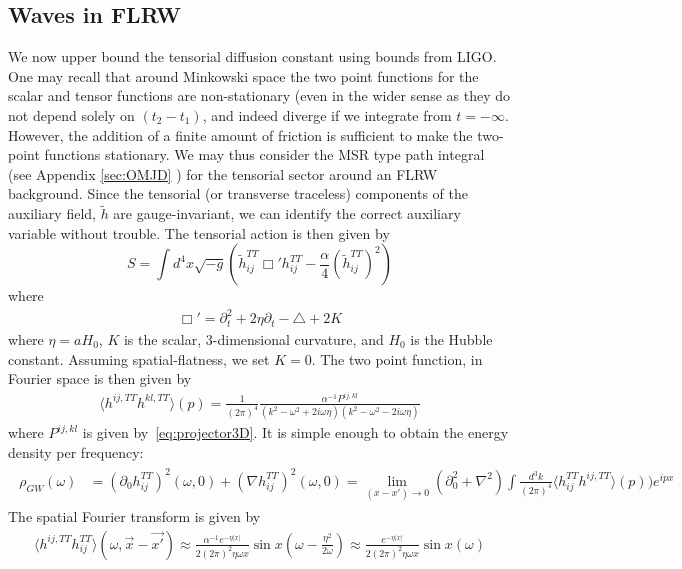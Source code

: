 \documentclass[aps,preprintnumbers,superscriptaddress,longbibliography]{revtex4-1}
\begin{document}
\subsection{Waves in FLRW}
\label{Tensor}
We now upper bound the tensorial diffusion constant using bounds from LIGO. One may recall that around Minkowski space the two point functions for the scalar and tensor functions are non-stationary (even in the wider sense as they do not depend solely on $(t_2-t_1)$, and indeed diverge if we integrate from $t=-\infty$. However, the addition of a finite amount of friction is sufficient to make the two-point functions stationary. We may thus consider the MSR type path integral (see Appendix \ref{sec:OMJD} ) for the tensorial sector around an FLRW background. Since the tensorial (or transverse traceless) components of the auxiliary field, $\tilde{h}$ are gauge-invariant, we can identify  the correct auxiliary variable without trouble.
The tensorial action is then given by
\begin{equation}
    S=\int d^4x\sqrt{-g}(\tilde{h}_{ij}^{TT}\Box'{h}_{ij}^{TT}-\frac{\alpha}{4} (\tilde{h}_{ij}^{TT})^2)
\end{equation}
where 
\begin{align}
\Box'=\partial_t^2+2\eta\partial_t-\triangle+2K
\end{align}
where $\eta=aH_0$, $K$ is the scalar, 3-dimensional curvature, and $H_0$ is the Hubble constant. Assuming spatial-flatness, we set $K=0$.
The two point function, in Fourier space is then given by 
\begin{align}
\label{HTT}
    \langle h^{ij,TT}h^{kl,TT}\rangle(p)=\frac{1}{(2\pi)^4}\frac{\alpha^{-1} P^{ij,kl}}{(k^2-\omega^2+2i\omega\eta)(k^2-\omega^2-2i\omega\eta)}
\end{align}
where $P^{ij,kl}$ is given by~\eqref{eq:projector3D}.
It is simple enough to obtain the energy density per frequency:
\begin{align}
\begin{split}
\rho_{GW}(\omega)&=(\partial_0h_{ij}^{TT})^2(\omega,0)+(\nabla h_{ij}^{TT})^2(\omega,0)= \lim_{(x-x')\rightarrow 0}(\partial_0^2+\nabla^2) \int \frac{d^3{k}}{(2\pi)^4}\langle h^{TT}_{ij}h^{ij,TT}\rangle(p))e^{ipx}
\end{split}
\end{align}
The spatial Fourier transform is given by
\begin{align}
 \langle h^{ij,TT}h^{TT}_{ij}\rangle(\omega,\vec{x}-\vec{x'}) \approx  \frac{\alpha^{-1}e^{-\eta|x|}}{2(2\pi)^2\eta\omega x}\sin{x(\omega-\frac{\eta^2}{2\omega})}\approx \frac{e^{-\eta|x|}}{2(2\pi)^2\eta\omega x}\sin{x(\omega)}
\end{align}
\end{document}
